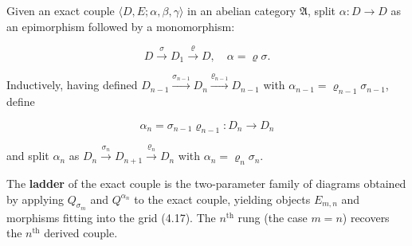 Given an exact couple $\langle D, E; \alpha, \beta, \gamma \rangle$ in an abelian category $\mathfrak{A}$, split $\alpha: D \to D$ as an epimorphism followed by a monomorphism:

$$D \xrightarrow{\sigma} D_1 \xrightarrow{\varrho} D, \quad \alpha = \varrho\sigma.$$

Inductively, having defined $D_{n-1} \xrightarrow{\sigma_{n-1}} D_n \xrightarrow{\varrho_{n-1}} D_{n-1}$ with $\alpha_{n-1} = \varrho_{n-1}\sigma_{n-1}$, define

$$\alpha_n = \sigma_{n-1}\varrho_{n-1}: D_n \to D_n$$

and split $\alpha_n$ as $D_n \xrightarrow{\sigma_n} D_{n+1} \xrightarrow{\varrho_n} D_n$ with $\alpha_n = \varrho_n\sigma_n$.

The \textbf{ladder} of the exact couple is the two-parameter family of diagrams obtained by applying $Q_{\sigma_m}$ and $Q^{\alpha_n}$ to the exact couple, yielding objects $E_{m,n}$ and morphisms fitting into the grid (4.17). The $n^{\text{th}}$ rung (the case $m=n$) recovers the $n^{\text{th}}$ derived couple.
